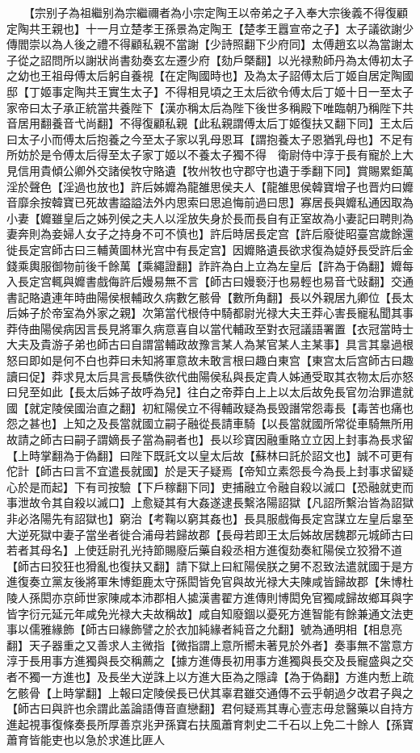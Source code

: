 　　【宗别子為祖繼别為宗繼禰者為小宗定陶王以帝弟之子入奉大宗後義不得復顧定陶共王親也】十一月立楚孝王孫景為定陶王【楚孝王囂宣帝之子】太子議欲謝少傳閻崇以為人後之禮不得顧私親不當謝【少詩照翻下少府同】太傅趙玄以為當謝太子從之詔問所以謝狀尚書劾奏玄左遷少府【劾戶槩翻】以光禄勲師丹為太傅初太子之幼也王祖母傅太后躬自養視【在定陶國時也】及為太子詔傅太后丁姬自居定陶國邸【丁姬事定陶共王實生太子】不得相見頃之王太后欲令傅太后丁姬十日一至太子家帝曰太子承正統當共養陛下【漢亦稱太后為陛下後世多稱殿下唯臨朝乃稱陛下共音居用翻養音弋尚翻】不得復顧私親【此私親謂傅太后丁姬復扶又翻下同】王太后曰太子小而傅太后抱養之今至太子家以乳母恩耳【謂抱養太子恩猶乳母也】不足有所妨於是令傅太后得至太子家丁姬以不養太子獨不得　衛尉侍中淳于長有寵於上大見信用貴傾公卿外交諸侯牧守賂遺【牧州牧也守郡守也遺于季翻下同】賞賜累鉅萬淫於聲色【淫過也放也】許后姊孊為龍雒思侯夫人【龍雒思侯韓寶增子也晋灼曰孊音靡余按韓寶已死故書謚謚法外内思索曰思追悔前過曰思】寡居長與孊私通因取為小妻【孊雖皇后之姊列侯之夫人以淫放失身於長而長自有正室故為小妻記曰聘則為妻奔則為妾婦人女子之持身不可不慎也】許后時居長定宫【許后廢徙昭臺宫歲餘還徙長定宫師古曰三輔黄圖林光宫中有長定宫】因孊賂遺長欲求復為媫妤長受許后金錢乘輿服御物前後千餘萬【乘繩證翻】詐許為白上立為左皇后【許為于偽翻】孊每入長定宫輒與孊書戲侮許后嫚易無不言【師古曰嫚䙝汙也易輕也易音弋䜴翻】交通書記賂遺連年時曲陽侯根輔政久病數乞骸骨【數所角翻】長以外親居九卿位【長太后姊子於帝室為外家之親】次第當代根侍中騎都尉光禄大夫王莽心害長寵私聞其事莽侍曲陽侯病因言長見將軍久病意喜自以當代輔政至對衣冠議語署置【衣冠當時士大夫及貴游子弟也師古曰自謂當輔政故豫言某人為某官某人主某事】具言其辠過根怒曰即如是何不白也莽曰未知將軍意故未敢言根曰趣白東宫【東宫太后宫師古曰趣讀曰促】莽求見太后具言長驕佚欲代曲陽侯私與長定貴人姊通受取其衣物太后亦怒曰兒至如此【長太后姊子故呼為兒】往白之帝莽白上上以太后故免長官勿治罪遣就國【就定陵侯國治直之翻】初紅陽侯立不得輔政疑為長毁譖常怨毒長【毒苦也痛也怨之甚也】上知之及長當就國立嗣子融從長請車騎【以長當就國所常從車騎無所用故請之師古曰嗣子謂嫡長子當為嗣者也】長以珍寶因融重賂立立因上封事為長求留【上時掌翻為于偽翻】曰陛下既託文以皇太后故【蘇林曰託於詔文也】誠不可更有佗計【師古曰言不宜遣長就國】於是天子疑焉【帝知立素怨長今為長上封事求留疑心於是而起】下有司按驗【下戶稼翻下同】吏捕融立令融自殺以滅口【恐融就吏而事泄故令其自殺以滅口】上愈疑其有大姦遂逮長繫洛陽詔獄【凡詔所繫治皆為詔獄非必洛陽先有詔獄也】窮治【考鞠以窮其姦也】長具服戲侮長定宫謀立左皇后辠至大逆死獄中妻子當坐者徙合浦母若歸故郡【長母若即王太后姊故居魏郡元城師古曰若者其母名】上使廷尉孔光持節賜廢后藥自殺丞相方進復劾奏紅陽侯立狡猾不道【師古曰狡狂也猾亂也復扶又翻】請下獄上曰紅陽侯朕之舅不忍致法遣就國于是方進復奏立黨友後將軍朱博鉅鹿太守孫閎皆免官與故光禄大夫陳咸皆歸故郡【朱博杜陵人孫閎亦京師世家陳咸本沛郡相人㨿漢書翟方進傳則博閎免官獨咸歸故鄉耳與字皆字衍元延元年咸免光禄大夫故稱故】咸自知廢錮以憂死方進智能有餘兼通文法吏事以儒雅緣飾【師古曰緣飾譬之於衣加純緣者純音之允翻】號為通明相【相息亮翻】天子器重之又善求人主微指【微指謂上意所嚮未著見於外者】奏事無不當意方淳于長用事方進獨與長交稱薦之【據方進傳長初用事方進獨與長交及長寵盛與之交者不獨一方進也】及長坐大逆誅上以方進大臣為之隱諱【為于偽翻】方進内慙上疏乞骸骨【上時掌翻】上報曰定陵侯長已伏其辜君雖交通傳不云乎朝過夕改君子與之【師古曰與許也余謂此盖論語傳音直戀翻】君何疑焉其專心壹志毋怠醫藥以自持方進起視事復條奏長所厚善京兆尹孫寶右扶風蕭育刺史二千石以上免二十餘人【孫寶蕭育皆能吏也以急於求進比匪人